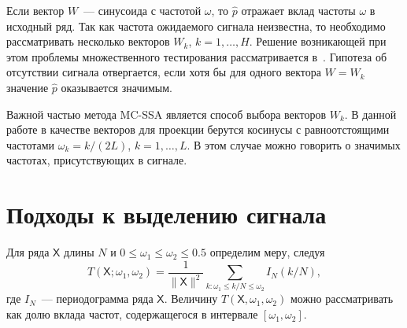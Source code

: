 \documentclass{math-mech-sci}
\begin{document}
Если вектор $W$~--- синусоида с частотой $\omega$, то $\widehat{p}$ отражает вклад частоты $\omega$ в исходный ряд. Так как частота ожидаемого сигнала неизвестна, то необходимо рассматривать несколько векторов $W_k$, $k=1,\ldots,H$. Решение возникающей при этом проблемы множественного тестирования рассматривается в~\cite{Golyandina2023}.
Гипотеза об отсутствии сигнала отвергается, если хотя бы для одного вектора $W=W_k$ значение $\widehat p$ оказывается значимым.

Важной частью метода MC-SSA является способ выбора векторов $W_k$. В данной работе в качестве векторов для проекции берутся косинусы с равноотстоящими частотами $\omega_k=k/(2L)$, $k=1,\ldots,L$. В этом случае можно говорить о значимых частотах, присутствующих в сигнале.

\section*{Подходы к выделению сигнала}
Для ряда $\mathsf{X}$ длины $N$ и $0\leqslant\omega_1\leqslant\omega_2\leqslant0.5$ определим меру, следуя~\cite{alexandrov}
$$
T(\mathsf{X};\omega_1,\omega_2)=\frac{1}{\|\mathsf{X}\|^2}\sum_{k:\omega_1\leqslant k/N\leqslant \omega_2}I_N(k/N),
$$
где $I_N$~--- периодограмма ряда $\mathsf{X}$. Величину $T(\mathsf{X},\omega_1,\omega_2)$ можно рассматривать как долю вклада частот, содержащегося в интервале $[\omega_1,\omega_2]$.
\end{document}
